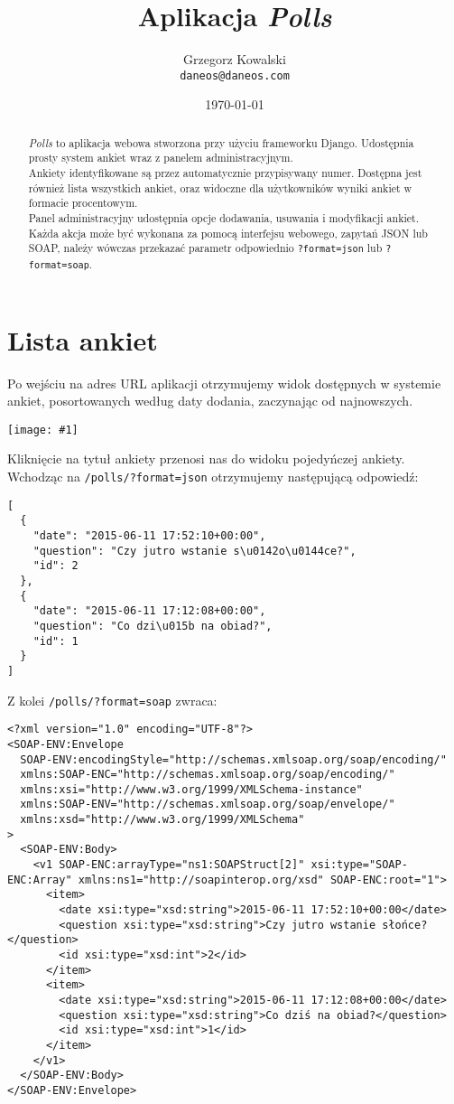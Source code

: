 \documentclass[12pt,a4paper]{article}
\title{Aplikacja \emph{Polls}}
\author{Grzegorz Kowalski\\\texttt{daneos@daneos.com}}
\date{\today}
\newcommand{\screenshot}[1]{\\\begin{minipage}[c]{\textwidth}\hspace{0em}\texttt{[image: \#1]}\end{minipage}\vspace{0em}}
\newcommand{\json}[1]{\texttt{#1?format=json}}
\newcommand{\soap}[1]{\texttt{#1?format=soap}}
\begin{document}
\maketitle

\begin{abstract}
\emph{Polls} to aplikacja webowa stworzona przy użyciu frameworku Django. Udostępnia prosty system ankiet wraz z panelem administracyjnym.\\
Ankiety identyfikowane są przez automatycznie przypisywany numer. Dostępna jest również lista wszystkich ankiet, oraz widoczne dla użytkowników wyniki ankiet w formacie procentowym.\\
Panel administracyjny udostępnia opcje dodawania, usuwania i modyfikacji ankiet.\\
Każda akcja może być wykonana za pomocą interfejsu webowego, zapytań JSON lub SOAP, należy wówczas przekazać parametr odpowiednio \json{} lub \soap{}.
\end{abstract}

\section{Lista ankiet}
Po wejściu na adres URL aplikacji otrzymujemy widok dostępnych w systemie ankiet, posortowanych według daty dodania, zaczynając od najnowszych.
\screenshot{poll_list.png}
Kliknięcie na tytuł ankiety przenosi nas do widoku pojedyńczej ankiety.
\newpage
Wchodząc na \json{/polls/} otrzymujemy następującą odpowiedź:
\begin{verbatim}
[
  {
    "date": "2015-06-11 17:52:10+00:00",
    "question": "Czy jutro wstanie s\u0142o\u0144ce?",
    "id": 2
  },
  {
    "date": "2015-06-11 17:12:08+00:00",
    "question": "Co dzi\u015b na obiad?",
    "id": 1
  }
]
\end{verbatim}
Z kolei \soap{/polls/} zwraca:
\begin{verbatim}
<?xml version="1.0" encoding="UTF-8"?>
<SOAP-ENV:Envelope
  SOAP-ENV:encodingStyle="http://schemas.xmlsoap.org/soap/encoding/"
  xmlns:SOAP-ENC="http://schemas.xmlsoap.org/soap/encoding/"
  xmlns:xsi="http://www.w3.org/1999/XMLSchema-instance"
  xmlns:SOAP-ENV="http://schemas.xmlsoap.org/soap/envelope/"
  xmlns:xsd="http://www.w3.org/1999/XMLSchema"
>
  <SOAP-ENV:Body>
    <v1 SOAP-ENC:arrayType="ns1:SOAPStruct[2]" xsi:type="SOAP-ENC:Array" xmlns:ns1="http://soapinterop.org/xsd" SOAP-ENC:root="1">
      <item>
        <date xsi:type="xsd:string">2015-06-11 17:52:10+00:00</date>
        <question xsi:type="xsd:string">Czy jutro wstanie słońce?</question>
        <id xsi:type="xsd:int">2</id>
      </item>
      <item>
        <date xsi:type="xsd:string">2015-06-11 17:12:08+00:00</date>
        <question xsi:type="xsd:string">Co dziś na obiad?</question>
        <id xsi:type="xsd:int">1</id>
      </item>
    </v1>
  </SOAP-ENV:Body>
</SOAP-ENV:Envelope>
\end{verbatim}
\end{document}

